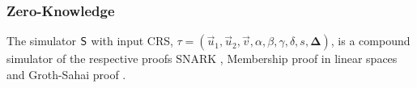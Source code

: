%
%

\subsubsection*{Zero-Knowledge}

The simulator $\mathsf{S}$ with input CRS, $\tau = (\vec{u}_1,\vec{u}_2,\vec{v}, \alpha, \beta,\gamma,\delta, s, \mathbf{\Delta})$, is a compound simulator of the respective proofs SNARK \cite{EC:Groth16}, Membership proof in linear spaces \cite{AC:GonHevRaf15} and Groth-Sahai proof \cite{EC:GroSah08}.